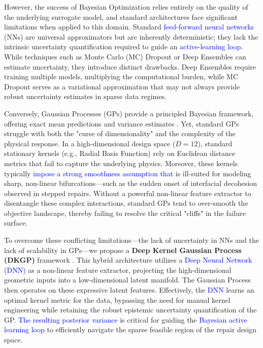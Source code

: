 \documentclass[
  preprint,
  12pt,
  a4paper
]{elsarticle}
\newcommand{\new}[1]{\textcolor{blue}{#1}}
\begin{document}
However, the success of Bayesian Optimization relies entirely on the quality of the underlying surrogate model, and standard architectures face significant limitations when applied to this domain. Standard \new{feed-forward neural networks} (NNs) are universal approximators but are inherently deterministic; they lack the intrinsic uncertainty quantification required to guide an \new{active-learning loop}. While techniques such as Monte Carlo (MC) Dropout \cite{gal2016dropout} or Deep Ensembles \cite{lakshminarayanan2017simple} can estimate uncertainty, they introduce distinct drawbacks. Deep Ensembles require training multiple models, multiplying the computational burden, while MC Dropout serves as a variational approximation that may not always provide robust uncertainty estimates in sparse data regimes.


Conversely, Gaussian Processes (GPs) provide a principled Bayesian framework, offering exact mean predictions and variance estimates \cite{rasmussen2006gaussian}. Yet, standard GPs struggle with both the "curse of dimensionality" and the complexity of the physical response. In a high-dimensional design space ($D=12$), standard stationary kernels (e.g., Radial Basis Function) rely on Euclidean distance metrics that fail to capture the underlying physics. Moreover, these kernels typically \new{impose a strong smoothness assumption that} is ill-suited for modeling sharp, non-linear bifurcations—such as the sudden onset of interfacial decohesion observed in stepped repairs. Without a powerful non-linear feature extractor to disentangle these complex interactions, standard GPs tend to over-smooth the objective landscape, thereby failing to resolve the critical "cliffs" in the failure surface.

To overcome these conflicting limitations—the lack of uncertainty in NNs and the lack of scalability in GPs—we propose a \textbf{Deep Kernel Gaussian Process (DKGP)} framework \cite{wilson2016deep}. This hybrid architecture utilizes a \new{Deep Neural Network (DNN)} as a non-linear feature extractor, projecting the high-dimensional geometric inputs into a low-dimensional latent manifold. The Gaussian Process then operates on these expressive latent features. Effectively, the \new{DNN} learns an optimal kernel metric for the data, bypassing the need for manual kernel engineering while retaining the robust epistemic uncertainty quantification of the GP. \new{The resulting posterior variance} is critical for guiding the \new{Bayesian active learning loop} to efficiently navigate the sparse feasible region of the repair design space.
\end{document}
